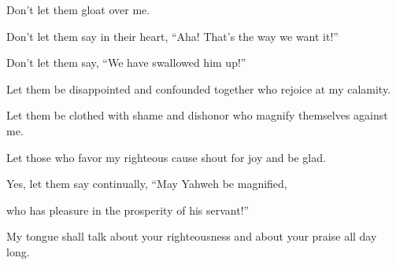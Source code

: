 {\par }{\QB Don’t let them gloat over me.
\par }{\Q {}Don’t let them say in their heart, “Aha! That’s the way we want it!”
\par }{\QB Don’t let them say, “We have swallowed him up!”
\par }{\Q {}Let them be disappointed and confounded together who rejoice at my calamity.
\par }{\QB Let them be clothed with shame and dishonor who magnify themselves against me.
\par }{\BB \par }{\Q {}Let those who favor my righteous cause shout for joy and be glad.
\par }{\QB Yes, let them say continually, “May Yahweh be magnified,
\par }{\QB who has pleasure in the prosperity of his servant!”
\par }{\Q {}My tongue shall talk about your righteousness and about your praise all day long.

}
